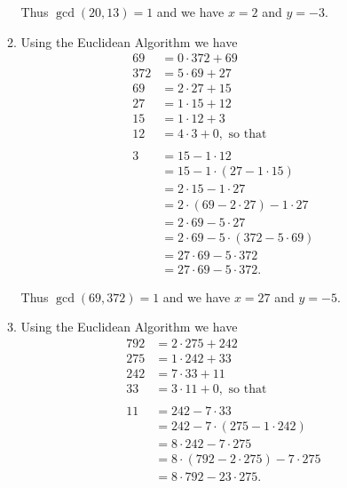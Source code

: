 \begin{enumerate}
\begin{enumerate}
               Thus $\gcd(20, 13) = 1$ and we have $x = 2$ and $y = -3$.
         \item Using the Euclidean Algorithm we have
               \begin{align*}
                  69  &= 0 \cdot 372 + 69 \\
                  372 &= 5 \cdot 69 + 27 \\
                  69  &= 2 \cdot 27 + 15 \\
                  27  &= 1 \cdot 15 + 12 \\
                  15  &= 1 \cdot 12 + 3 \\
                  12  &= 4 \cdot 3 + 0, \text{ so that } \\ \\
                   3 &= 15 - 1 \cdot 12 \\
                     &= 15 - 1 \cdot (27 - 1 \cdot 15) \\
                     &= 2 \cdot 15 - 1 \cdot 27 \\
                     &= 2 \cdot (69 - 2 \cdot 27) - 1 \cdot 27 \\
                     &= 2 \cdot 69 - 5 \cdot 27 \\
                     &= 2 \cdot 69 - 5 \cdot (372 - 5 \cdot 69) \\
                     &= 27 \cdot 69 - 5 \cdot 372 \\
                     &= 27 \cdot 69 - 5 \cdot 372.
               \end{align*}

               Thus $\gcd(69, 372) = 1$ and we have $x = 27$ and $y = -5$.
         \item Using the Euclidean Algorithm we have
               \begin{align*}
                  792 &= 2 \cdot 275 + 242 \\
                  275 &= 1 \cdot 242 + 33 \\
                  242 &= 7 \cdot 33 + 11 \\
                  33  &= 3 \cdot 11 + 0, \text{ so that } \\ \\
                  11  &= 242 - 7 \cdot 33 \\
                      &= 242 - 7 \cdot (275 - 1 \cdot 242) \\
                      &= 8 \cdot 242 - 7 \cdot 275 \\
                      &= 8 \cdot (792 - 2 \cdot 275) - 7 \cdot 275 \\
                      &= 8 \cdot 792 - 23 \cdot 275.
               \end{align*}


\end{enumerate}
\end{enumerate}
